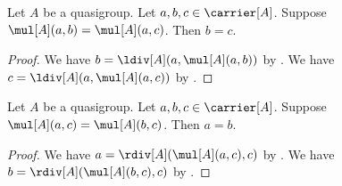 \begin{lemma}\label{quasigroup_cancel_left}
    Let $A$ be a quasigroup.
    Let $a,b,c\in\carrier[A]$.
    Suppose $\mul[A](a,b) = \mul[A](a,c)$.
    Then $b = c$.
\end{lemma}
\begin{proof}
    We have $b=\ldiv[A](a,\mul[A](a,b))$ by .
    We have $c=\ldiv[A](a,\mul[A](a,c))$ by .
\end{proof}

\begin{lemma}\label{quasigroup_cancel_right}
    Let $A$ be a quasigroup.
    Let $a,b,c\in\carrier[A]$.
    Suppose $\mul[A](a,c) = \mul[A](b,c)$.
    Then $a = b$.
\end{lemma}
\begin{proof}
    We have $a=\rdiv[A](\mul[A](a,c),c)$ by .
    We have $b=\rdiv[A](\mul[A](b,c),c)$ by .
\end{proof}
